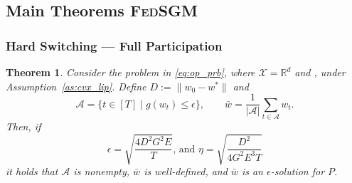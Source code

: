 \documentclass{article} %
\newtheorem{theorem}{Theorem}[]
\def\R{{\mathbb{R}}}
\def\A{{\mathcal A}}
\begin{document}
\subsection{Main Theorems \textsc{FedSGM}}
\subsubsection{Hard Switching --- Full Participation}
\begin{theorem}
\label{thm:fedhsgm_full}
Consider the problem in \cref{eq:op_prb}, where $\mathcal{X} = \R^d$ and , under Assumption~\ref{as:cvx_lip}. Define $D:=\|w_0-w^*\|$ and
\begin{equation*}
\A = \{t\in [T]\;| \;g(w_{t})\leq \epsilon\}, \qquad \bar{w} = \frac{1}{|\A|} \sum_{t\in \A} w_t.
 \end{equation*}
Then, if
\begin{equation*}
\epsilon = \sqrt{\frac{{4 D^2 G^2 E}}{{T}}}\text{, and  } \eta = \sqrt{\frac{D^2}{4G^2 E^3 T}} 
 \end{equation*}
it holds that $\A$ is nonempty, $\bar{w}$ is well-defined, and $\bar{w}$ is an $\epsilon$-solution for $P$.
\end{theorem}
\end{document}
